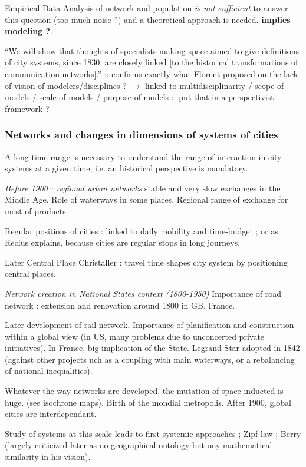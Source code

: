 Empirical Data Analysis of network and population \emph{is not sufficient} to answer this question (too much noise ?) and a theoretical approach is needed. \textbf{implies modeling ?}.

``We will show that thoughts of specialists making space aimed to give definitions of city systems, since 1830, are closely linked [to the historical transformations of communication networks].'' :: confirms exactly what Florent proposed on the lack of vision of modelers/disciplines ? $\rightarrow$ linked to multidisciplinarity / scope of models / scale of models / purpose of models :: put that in a perspectivist framework ? 




\subsubsection{Networks and changes in dimensions of systems of cities}

A long time range is necessary to understand the range of interaction in city systems at a given time, i.e. an historical perspective is mandatory.

\textit{Before 1900 : regional urban networks} stable and very slow exchanges in the Middle Age. Role of waterways in some places. Regional range of exchange for most of products.

Regular positions of cities : linked to daily mobility and time-budget ; or as Reclus explains, because cities are regular stops in long journeys.

Later Central Place Christaller : travel time shapes city system by positioning central places.

\textit{Network creation in National States context (1800-1950)} Importance of road network : extension and renovation around 1800 in GB, France.

Later development of rail network. Importance of planification and construction within a global view (in US, many problems due to unconcerted private initiatives).
In France, big implication of the State. Legrand Star adopted in 1842 (against other projects uch as a coupling with main waterways, or a rebalancing of national inequalities).

Whatever the way networks are developed, the mutation of space inducted is huge. (see isochrone maps). Birth of the mondial metropolis. After 1900, global cities are interdependant.

Study of systems at this scale leads to first systemic approaches ; Zipf law ; Berry (largely criticized later as no geographical ontology but ony mathematical similarity in his vision).

